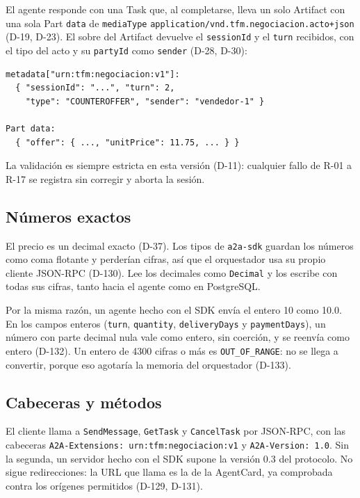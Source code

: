 El agente responde con una Task que, al completarse, lleva un solo Artifact con una sola Part \texttt{data} de \texttt{mediaType} \texttt{application/vnd.tfm.negociacion.acto+json} (D-19, D-23). El sobre del Artifact devuelve el \texttt{sessionId} y el \texttt{turn} recibidos, con el tipo del acto y su \texttt{partyId} como \texttt{sender} (D-28, D-30):

\begin{verbatim}
metadata["urn:tfm:negociacion:v1"]:
  { "sessionId": "...", "turn": 2,
    "type": "COUNTEROFFER", "sender": "vendedor-1" }

Part data:
  { "offer": { ..., "unitPrice": 11.75, ... } }
\end{verbatim}

La validación es siempre estricta en esta versión (D-11): cualquier fallo de R-01 a R-17 se registra sin corregir y aborta la sesión.

\subsection{Números exactos}

El precio es un decimal exacto (D-37). Los tipos de \texttt{a2a-sdk} guardan los números como coma flotante y perderían cifras, así que el orquestador usa su propio cliente JSON-RPC (D-130). Lee los decimales como \texttt{Decimal} y los escribe con todas sus cifras, tanto hacia el agente como en PostgreSQL.

Por la misma razón, un agente hecho con el SDK envía el entero 10 como 10.0. En los campos enteros (\texttt{turn}, \texttt{quantity}, \texttt{deliveryDays} y \texttt{paymentDays}), un número con parte decimal nula vale como entero, sin coerción, y se reenvía como entero (D-132). Un entero de 4300 cifras o más es \texttt{OUT\_OF\_RANGE}: no se llega a convertir, porque eso agotaría la memoria del orquestador (D-133).

\subsection{Cabeceras y métodos}

El cliente llama a \texttt{SendMessage}, \texttt{GetTask} y \texttt{CancelTask} por JSON-RPC, con las cabeceras \texttt{A2A-Extensions: urn:tfm:negociacion:v1} y \texttt{A2A-Version: 1.0}. Sin la segunda, un servidor hecho con el SDK supone la versión 0.3 del protocolo. No sigue redirecciones: la URL que llama es la de la AgentCard, ya comprobada contra los orígenes permitidos (D-129, D-131).


